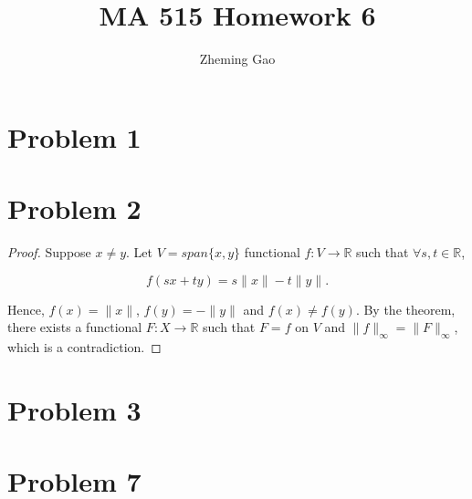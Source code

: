 \documentclass[12pt]{article}
\begin{document}
 
 
\title{MA 515 Homework 6}
\author{Zheming Gao}
\maketitle

\section*{Problem 1}

\section*{Problem 2}

\begin{proof}

Suppose $x \neq y$. Let $V = span\{x, y\}$ functional $f: V\rightarrow \mathbb R $ such that $\forall s, t\in \mathbb R$, 

$$
f(sx + ty) = s\|x\| - t\|y\|.
$$

Hence, $f(x) = \|x\|$, $f(y) = -\|y\|$ and $f(x)\neq f(y)$. By the theorem, there exists a functional $F: X\rightarrow \mathbb R$ such that $F = f$ on $V$ and $\|f\|_\infty = \|F\|_\infty$, which is a contradiction.

\end{proof}

\section*{Problem 3}


\section*{Problem 7}
\end{document}
